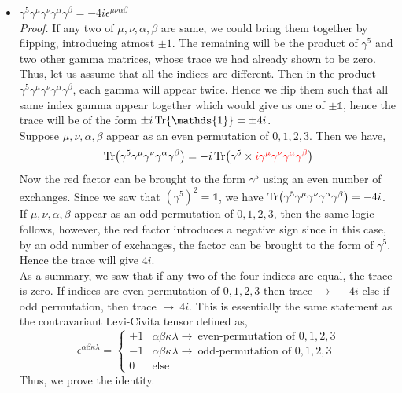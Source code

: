 \begin{itemize}
\item $\gamma^5 \gamma^\mu\gamma^\nu \gamma^\alpha \gamma^\beta = -4i \epsilon^{\mu\nu\alpha\beta}$\\[0.25cm]
\textit{Proof.} If any two of $\mu,\nu,\alpha,\beta$ are same, we could bring them together by flipping, introducing atmost $\pm 1$. The remaining will be the product of $\gamma^5$ and two other gamma matrices, whose trace we had already shown to be zero.\\[0.2cm] Thus, let us assume that all the indices are different. Then in the product  $\gamma^5 \gamma^\mu\gamma^\nu \gamma^\alpha \gamma^\beta$, each gamma will appear twice. Hence we flip them such that all same index gamma appear together which would give us one of $\pm \mathds{1}$, hence the trace will be of the form $\pm i \Tr \mathds{1} = \pm 4i$. \\[0.25cm]
Suppose $\mu,\nu,\alpha,\beta$ appear as an even permutation of $0,1,2,3$. Then we have, $$\Tr (\gamma^5\gamma^\mu\gamma^\nu \gamma^\alpha \gamma^\beta) =-i \Tr(\gamma^5\times \mathcolor{red}{i\gamma^\mu\gamma^\nu \gamma^\alpha \gamma^\beta})$$ Now the red factor can be brought to the form $\gamma^5$ using an even number of exchanges. Since we saw that $(\gamma^5)^2=\mathds{1}$, we have $\Tr (\gamma^5\gamma^\mu\gamma^\nu \gamma^\alpha \gamma^\beta) = -4i$. \\[0.2cm]
If $\mu,\nu,\alpha,\beta$ appear as an odd permutation of $0,1,2,3$, then the same logic follows, however, the red factor introduces a negative sign since in this case, by an odd number of exchanges, the factor can be brought to the form of $\gamma^5$. Hence the trace will give $4i$. \\[0.2cm]
As a summary, we saw that if any two of the four indices are equal, the trace is zero. If indices are even permutation of $0,1,2,3$ then trace $\to\ -4i$ else if odd permutation, then trace $\to\ 4i$. This is essentially the same statement as the contravariant Levi-Civita tensor defined as, 
$$\epsilon^{\alpha\beta\kappa\lambda } = \begin{cases}
    +1 & \alpha\beta\kappa\lambda \to \ \text{even-permutation of } 0,1,2,3\\
    -1 &  \alpha\beta\kappa\lambda \to \ \text{odd-permutation of } 0,1,2,3\\
    0 & \text{else}
\end{cases}$$
Thus, we prove the identity. 
\end{itemize}
